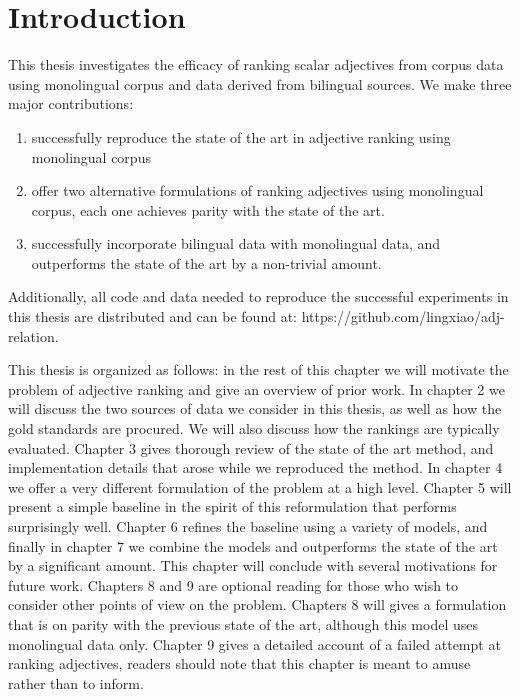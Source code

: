 \section{Introduction}

This thesis investigates the efficacy of ranking scalar adjectives from corpus data using monolingual corpus and data derived from bilingual sources. We make three major contributions:

\begin{enumerate}
	\item successfully reproduce the state of the art in adjective ranking using monolingual corpus
	\item offer two alternative formulations of ranking adjectives using monolingual corpus, each one achieves parity with the state of the art. 
	\item successfully incorporate bilingual data with monolingual data, and outperforms the state of the art by a non-trivial amount.
\end{enumerate}

Additionally, all code and data needed to reproduce the successful experiments in this thesis are distributed and can be found at: https://github.com/lingxiao/adj-relation. 

This thesis is organized as follows: in the rest of this chapter we will motivate the problem of adjective ranking and give an overview of prior work. In chapter 2 we will discuss the two sources of data we consider in this thesis, as well as how the gold standards are procured. We will also discuss how the rankings are typically evaluated. Chapter 3 gives thorough review of the state of the art method, and implementation details that arose while we reproduced the method. In chapter 4 we offer a very different formulation of the problem at a high level. Chapter 5 will present a simple baseline in the spirit of this reformulation that performs surprisingly well. Chapter 6 refines the baseline using a variety of models, and finally in chapter 7 we combine the models and outperforms the state of the art by a significant amount. This chapter will conclude with several motivations for future work. Chapters 8 and 9 are optional reading for those who wish to consider other points of view on the problem. Chapters 8 will gives a formulation that is on parity with the previous state of the art, although this model uses monolingual data only. Chapter 9 gives a detailed account of a failed attempt at ranking adjectives, readers should note that this chapter is meant to amuse rather than to inform.  

